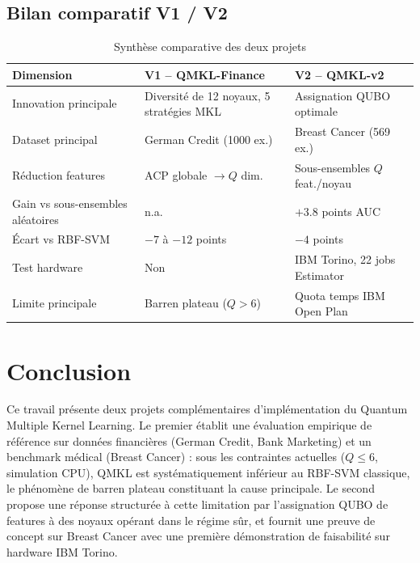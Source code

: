\documentclass[12pt,a4paper]{article}
\begin{document}
\subsection{Bilan comparatif V1 / V2}

\begin{table}[H]
\centering
\caption{Synthèse comparative des deux projets}
\label{tab:bilan}
\begin{tabular}{@{}lll@{}}
\toprule
\textbf{Dimension} & \textbf{V1 -- QMKL-Finance} & \textbf{V2 -- QMKL-v2} \\
\midrule
Innovation principale  & Diversité de 12 noyaux, 5 stratégies MKL & Assignation QUBO optimale \\
Dataset principal      & German Credit (1000 ex.)     & Breast Cancer (569 ex.) \\
Réduction features     & ACP globale $\to Q$ dim.     & Sous-ensembles $Q$ feat./noyau \\
Gain vs sous-ensembles aléatoires & n.a.          & $+3.8$ points AUC \\
Écart vs RBF-SVM       & $-7$ à $-12$ points          & $-4$ points \\
Test hardware          & Non                          & IBM Torino, 22 jobs Estimator \\
Limite principale      & Barren plateau ($Q > 6$)     & Quota temps IBM Open Plan \\
\bottomrule
\end{tabular}
\end{table}

\section{Conclusion}
\label{sec:conclusion}

Ce travail présente deux projets complémentaires d'implémentation du Quantum
Multiple Kernel Learning.
Le premier établit une évaluation empirique de référence sur données financières
(German Credit, Bank Marketing) et un benchmark médical (Breast Cancer) :
sous les contraintes actuelles ($Q \leq 6$, simulation CPU), QMKL est
systématiquement inférieur au RBF-SVM classique, le phénomène de barren plateau
constituant la cause principale.
Le second propose une réponse structurée à cette limitation par l'assignation
QUBO de features à des noyaux opérant dans le régime sûr, et fournit une
preuve de concept sur Breast Cancer avec une première démonstration de
faisabilité sur hardware IBM Torino.
\end{document}
